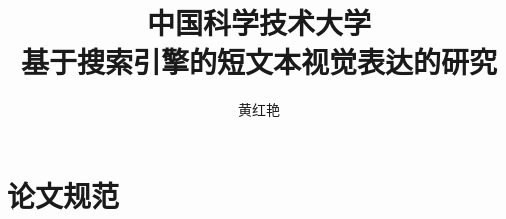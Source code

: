 \documentclass[bachelor,fontset=windowsold]{ustcthesis}
\title{中国科学技术大学\\基于搜索引擎的短文本视觉表达的研究}
\author{黄红艳}
\begin{document}
\maketitle

%
%
%

\frontmatter

\tableofcontents


\listoffigures
\listoftables
\listofalgorithms  %
% 

\mainmatter














\appendix
\chapter{论文规范}

\backmatter


\end{document}
